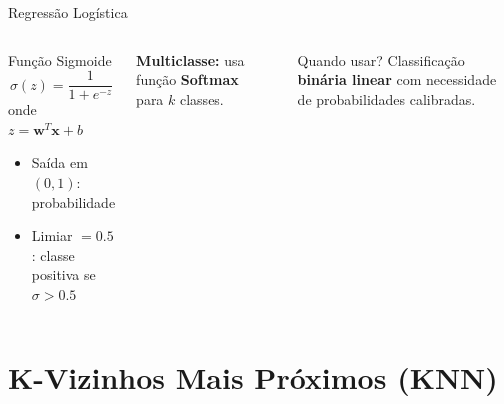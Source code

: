 \documentclass[aspectratio=169]{beamer}
\begin{document}
\begin{frame}{Regressão Logística}
\begin{columns}[T]
\begin{block}{Função Sigmoide}
\vspace{0.3em}
\[\sigma(z) = \frac{1}{1 + e^{-z}}\]
\vspace{0.1em}
onde $z = \mathbf{w}^T \mathbf{x} + b$
\vspace{0.3em}
\begin{itemize}
  \item Saída em $(0, 1)$: probabilidade
  \item Limiar $= 0.5$: classe positiva se $\sigma > 0.5$
\end{itemize}
\end{block}
\vspace{0.3em}
\textbf{Multiclasse:} usa função \textbf{Softmax} para $k$ classes.

\begin{center}
\end{center}
\begin{exampleblock}{Quando usar?}
  Classificação \textbf{binária linear} com necessidade de probabilidades calibradas.
\end{exampleblock}
\end{columns}
\end{frame}

\section{K-Vizinhos Mais Próximos (KNN)}
\end{document}
